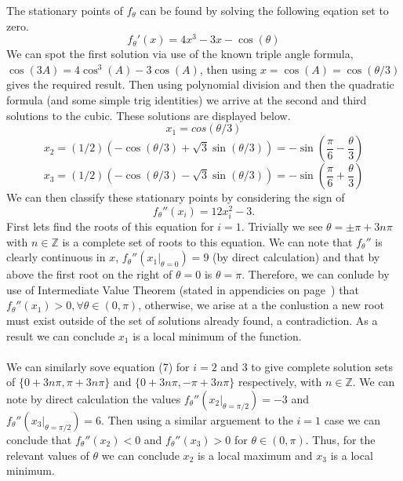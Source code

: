 \documentclass{article}
\begin{document}
The stationary points of $f_\theta$ can be found by solving the following eqation set to zero.
\begin{equation}
f_\theta'(x) = 4x^3-3x- \cos(\theta)
\end{equation}
We can spot the first solution via use of the known triple angle formula, $\cos(3A)=4\cos^3(A)-3\cos(A)$, then using $x=\cos(A)=\cos(\theta / 3)$ gives the required result. Then using polynomial division and then the quadratic formula (and some simple trig identities) we arrive at the second and third solutions to the cubic. These solutions are displayed below. 
\begin{equation}
x_1 = cos(\theta/3)
\end{equation}
\begin{equation}
x_2 =(1/2)(-\cos(\theta/3)+ \sqrt{3}\sin(\theta/3))=-\sin \left( \frac{\pi}{6}-\frac{\theta}{3} \right)
\end{equation}
\begin{equation}
x_3 =(1/2)(-\cos(\theta/3)- \sqrt{3}\sin(\theta/3))=-\sin \left( \frac{\pi}{6}+\frac{\theta}{3} \right)
\end{equation}
We can then classify these stationary points by considering the sign of 
\begin{equation}
f_\theta ''(x_i)=12x_i^2-3. 
\end{equation}
First lets find the roots of this equation for $i=1$. Trivially we see $\theta = \pm \pi + 3n \pi $ with $n \in \mathbb{Z} $ is a complete set of roots to this equation. We can note that $f_\theta''$ is clearly continuous in $x$, $f_\theta''(x_1|_{\theta=0})=9$ (by direct calculation) and that by above the first root on the right of $\theta=0$ is $\theta=\pi$. Therefore, we can conlude by use of Intermediate Value Theorem (stated in appendicies on page~\pageref{IVT}) that $f_\theta''(x_1)>0,  \forall \theta \in (0,\pi)$, otherwise, we arise at a the conlustion a new root must exist outside of the set of solutions already found, a contradiction. As a result we can conclude $x_1$ is a local minimum of the function.\\
\\
We can similarly sove equation (7) for $i=2$ and $3$ to give complete solution sets of $\{0+3n\pi,\pi+3n\pi\}$ and $\{0+3n\pi,-\pi+3n\pi\}$ respectively, with $n \in \mathbb{Z} $. We can note by direct calculation the values $f_\theta''(x_2|_{\theta=\pi/2})=-3$ and $f_\theta''(x_3|_{\theta=\pi/2})=6$. Then using a similar arguement to the $i=1$ case we can conclude that $f_\theta''(x_2)<0$ and $f_\theta''(x_3)>0$ for $\theta \in (0,\pi)$. Thus, for the relevant values of $\theta$ we can conclude $x_2$ is a local maximum and $x_3$ is a local minimum. \\
\end{document}
